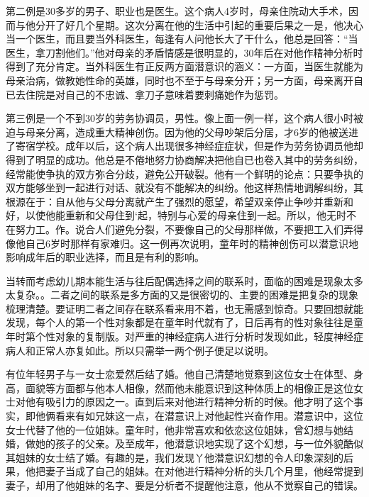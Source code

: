 \documentclass[UTF8,10pt,a4paper,openany]{book}
\begin{document}
第二例是30多岁的男子、职业也是医生。这个病人4岁时，母亲住院动大手术，因而与他分开了好几个星期。这次分离在他的生活中引起的重要后果之一是，他决心当一个医生，而且要当外科医生，每逢有人问他长大了干什么，他总是回答：“当医生，拿刀割他们。”他对母亲的矛盾情感是很明显的，30年后在对他作精神分析时得到了充分肯定。当外科医生有正反两方面潜意识的涵义：一方面，当医生就能为母亲治病，做教她性命的英雄，同时也不至于与母亲分开；另一方面，母亲离开自已去住院是对自己的不忠诚、拿刀子意味着要刺痛她作为惩罚。

第三例是一个不到30岁的劳务协调员，男性。像上面一例一样，这个病人很小时被迫与母亲分离，造成重大精神创伤。因为他的父母吵架后分居，才6岁的他被送进了寄宿学校。成年以后，这个病人出现很多神经症症状，但是作为劳务协调员他却得到了明显的成功。他总是不倦地努力协商解决把他自已也卷入其中的劳务纠纷，经常能使争执的双方弥合分歧，避免公开破裂。他有一个鲜明的论点：只要争执的双方能够坐到一起进行对话、就没有不能解决的纠纷。他这样热情地调解纠纷，其根源在于：自从他与父母分离就产生了强烈的愿望，希望双亲停止争吵并重新和好，以使他能重新和父母住到‘起，特别与心爱的母亲住到一起。所以，他无时不在努力工。作。说合人们避免分裂，不要像自己的父母那样做，不要把工入们弄得像他自己6岁时那样有家难归。这一例再次说明，童年时的精神创伤可以潜意识地影响成年后的职业选择，而且是有利的影响。

当转而考虑幼儿期本能生活与往后配偶选择之间的联系时，面临的困难是现象太多太复杂。。二者之间的联系是多方面的又是很密切的、主要的困难是把复杂的现象梳理清楚。要证明二者之间存在联系看来用不着，也无需感到惊奇。只要回想就能发现，每个人的第一个性对象都是在童年时代就有了，日后再有的性对象往往是童年时第个性对象的复制版。对严重的神经症病人进行分析时发现如此，轻度神经症病人和正常人亦复如此。所以只需举一两个例子便足以说明。

有位年轻男子与一女士恋爱然后结了婚。他自己清楚地觉察到这位女士在体型、身高，面貌等方面都与他本人相像，然而他未能意识到这种体质上的相像正是这位女士对他有吸引力的原因之一。直到后来对他进行精神分析的时候。他才明了这个事实，即他俩看来有如兄妹这一点，在潜意识上对他起性兴奋作用。潜意识中，这位女士代替了他的一位姐妹。童年时，他非常喜欢和依恋这位姐妹，曾幻想与她结婚，做她的孩子的父亲。及至成年，他潜意识地实现了这个幻想，与一位外貌酷似其姐妹的女士结了婚。有趣的是，我们发现丫他潜意识幻想的令人印象深刻的后果，他把妻子当成了自己的姐妹。在对他进行精神分析的头几个月里，他经常提到妻子，却用了他姐妹的名字、要是分析者不提醒他注意，他从不觉察自己的错误。
\end{document}
